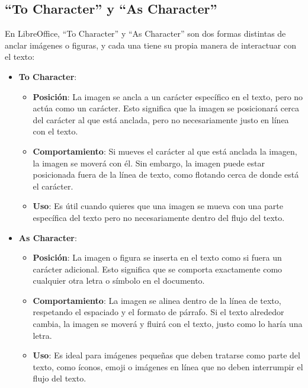 \documentclass[
  jou,
  floatsintext,
  longtable,
  a4paper,
  nolmodern,
  notxfonts,
  notimes,
  colorlinks=true,linkcolor=blue,citecolor=blue,urlcolor=blue]{apa7}
\begin{document}
\subsection{``To Character'' y ``As
Character''}\label{to-character-y-as-character}

En LibreOffice, ``To Character'' y ``As Character'' son dos formas
distintas de anclar imágenes o figuras, y cada una tiene su propia
manera de interactuar con el texto:

\begin{itemize}
\item
  \textbf{To Character}:

  \begin{itemize}
  \item
    \textbf{Posición}: La imagen se ancla a un carácter específico en el
    texto, pero no actúa como un carácter. Esto significa que la imagen
    se posicionará cerca del carácter al que está anclada, pero no
    necesariamente justo en línea con el texto.
  \item
    \textbf{Comportamiento}: Si mueves el carácter al que está anclada
    la imagen, la imagen se moverá con él. Sin embargo, la imagen puede
    estar posicionada fuera de la línea de texto, como flotando cerca de
    donde está el carácter.
  \item
    \textbf{Uso}: Es útil cuando quieres que una imagen se mueva con una
    parte específica del texto pero no necesariamente dentro del flujo
    del texto.
  \end{itemize}
\item
  \textbf{As Character}:

  \begin{itemize}
  \item
    \textbf{Posición}: La imagen o figura se inserta en el texto como si
    fuera un carácter adicional. Esto significa que se comporta
    exactamente como cualquier otra letra o símbolo en el documento.
  \item
    \textbf{Comportamiento}: La imagen se alinea dentro de la línea de
    texto, respetando el espaciado y el formato de párrafo. Si el texto
    alrededor cambia, la imagen se moverá y fluirá con el texto, justo
    como lo haría una letra.
  \item
    \textbf{Uso}: Es ideal para imágenes pequeñas que deben tratarse
    como parte del texto, como íconos, emoji o imágenes en línea que no
    deben interrumpir el flujo del texto.
  \end{itemize}
\end{itemize}
\end{document}
